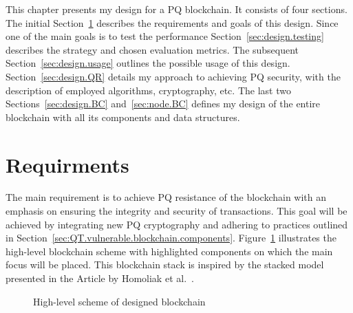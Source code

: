 This chapter presents my design for a PQ blockchain. It consists of four sections. The initial Section~\ref{sec:design.requirments} describes the requirements and goals of this design. Since one of the main goals is to test the performance Section~\ref{sec:design.testing} describes the strategy and chosen evaluation metrics. The subsequent Section~\ref{sec:design.usage} outlines the possible usage of this design. Section~\ref{sec:design.QR} details my approach to achieving PQ security, with the description of employed algorithms, cryptography, etc. The last two Sections~\ref{sec:design.BC} and~\ref{sec:node.BC} defines my design of the entire blockchain with all its components and data structures.



\section{Requirments}
\label{sec:design.requirments}

The main requirement is to achieve PQ resistance of the blockchain with an emphasis on ensuring the integrity and security of transactions. This goal will be achieved by integrating new PQ cryptography and adhering to practices outlined in Section~\ref{sec:QT.vulnerable.blockchain.components}. Figure~\ref{figure:design.blockchain.high-level} illustrates the high-level blockchain scheme with highlighted components on which the main focus will be placed. This blockchain stack is inspired by the stacked model presented in the Article by Homoliak et al.~\cite{bc.sec.homoliak}.

\begin{figure}[h]
    \begin{center}
    \end{center}
    \caption{High-level scheme of designed blockchain}
    \label{figure:design.blockchain.high-level}
\end{figure}

